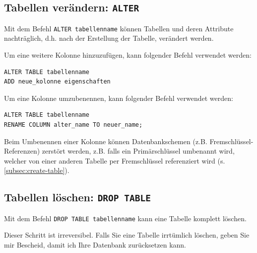 \subsection{Tabellen verändern: \texorpdfstring{\lstinline|ALTER|}{ALTER}}
Mit dem Befehl \lstinline|ALTER tabellenname| können Tabellen und deren Attribute nachträglich, d.h. nach der Erstellung der Tabelle, verändert werden.

\begin{myexample}
Um eine weitere Kolonne hinzuzufügen, kann folgender Befehl verwendet werden:
\begin{lstlisting}
ALTER TABLE tabellenname
ADD neue_kolonne eigenschaften
\end{lstlisting}
\end{myexample}

\begin{myexample}
Um eine Kolonne umzubenennen, kann folgender Befehl verwendet werden:
\begin{lstlisting}
ALTER TABLE tabellenname
RENAME COLUMN alter_name TO neuer_name;
\end{lstlisting}
\end{myexample}
\begin{mycaution}
Beim Umbenennen einer Kolonne können Datenbankschemen (z.B. Fremschlüssel-Referenzen) zerstört werden, z.B. falls ein Primärschlüssel umbenannt wird, welcher von einer anderen Tabelle per Fremschlüssel referenziert wird (s. \cref{subsec:create-table}).
\end{mycaution}

\subsection{Tabellen löschen: \texorpdfstring{\lstinline|DROP TABLE|}{DROP TABLE}}
Mit dem Befehl \lstinline|DROP TABLE tabellenname| kann eine Tabelle komplett löschen.

\begin{mycaution}
  Dieser Schritt ist irreversibel. Falls Sie eine Tabelle irrtümlich löschen, geben Sie mir Bescheid, damit ich Ihre Datenbank zurücksetzen kann.
\end{mycaution}

